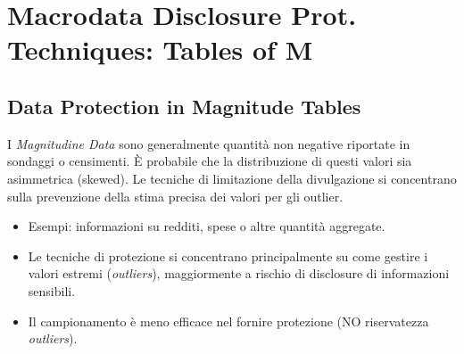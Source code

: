 \documentclass{report}
\begin{document}
\section{Macrodata Disclosure Prot. Techniques: Tables of M}

\subsection{Data Protection in Magnitude Tables}
I \textit{Magnitudine Data} sono generalmente quantità non negative riportate in sondaggi o censimenti. È probabile che la distribuzione di questi valori sia asimmetrica (skewed). Le tecniche di limitazione della divulgazione si concentrano sulla prevenzione della stima precisa dei valori per gli outlier.

\begin{itemize}
    \item Esempi: informazioni su redditi, spese o altre quantità aggregate.
    \item Le tecniche di protezione si concentrano principalmente su come gestire i valori estremi (\textit{outliers}), maggiormente a rischio di disclosure di informazioni sensibili.
    \item Il campionamento è meno efficace nel fornire protezione (NO riservatezza \textit{outliers}).
\end{itemize}
\end{document}
